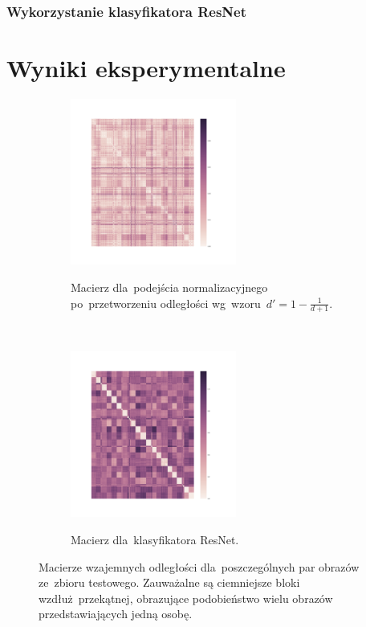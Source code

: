 \documentclass[11pt,a4paper]{article}
\begin{document}
\subsubsection{Wykorzystanie klasyfikatora ResNet}

\section{Wyniki eksperymentalne}
\label{sec:results}

\begin{figure}[H]
    \begin{subfigure}{\textwidth}
        \centering
        \includegraphics[width=0.6\textwidth]{res/img/normalized_distance_matrix.png}
        \label{subfig:normalized-distance-matrix}
        \caption{Macierz dla~podejścia normalizacyjnego po~przetworzeniu odległości wg~wzoru~$d' = 1 - \frac{1}{d + 1}$.}
    \end{subfigure}
    \\
    \begin{subfigure}{\textwidth}
        \centering
        \includegraphics[width=0.6\textwidth]{res/img/resnet_distance_matrix.png}
        \label{subfig:resnet-distance-matrix}
        \caption{Macierz dla~klasyfikatora ResNet.}
    \end{subfigure}
    \caption{Macierze wzajemnych odległości dla~poszczególnych par obrazów ze~zbioru testowego.
    Zauważalne są ciemniejsze bloki wzdłuż~przekątnej, obrazujące podobieństwo wielu obrazów przedstawiających jedną osobę.}
\end{figure}
\end{document}
